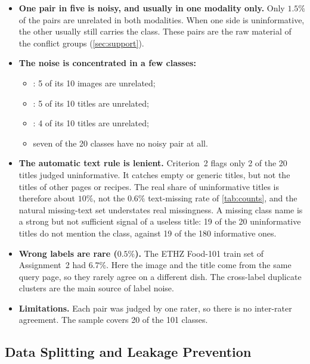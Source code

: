 \begin{itemize}
  \item \textbf{One pair in five is noisy, and usually in one modality only.} Only $1.5\%$ of the pairs are
        unrelated in both modalities. When one side is uninformative, the other usually still carries the class.
        These pairs are the raw material of the conflict groups (\cref{sec:support}).
  \item \textbf{The noise is concentrated in a few classes:}
        \begin{itemize}
          \item {}: 5 of its 10 images are unrelated;
          \item {}: 5 of its 10 titles are unrelated;
          \item {}: 4 of its 10 titles are unrelated;
          \item seven of the 20 classes have no noisy pair at all.
        \end{itemize}
  \item \textbf{The automatic text rule is lenient.} Criterion~2 flags only 2 of the 20 titles judged
        uninformative. It catches empty or generic titles, but not the titles of other pages or recipes.
        The real share of uninformative titles is therefore about $10\%$, not the $0.6\%$ text-missing rate of
        \cref{tab:counts}, and the natural missing-text set understates real missingness. A missing class name is
        a strong but not sufficient signal of a useless title: 19 of the 20 uninformative titles do not mention
        the class, against 19 of the 180 informative ones.
  \item \textbf{Wrong labels are rare ($0.5\%$).} The ETHZ Food-101 train set of Assignment~2 had $6.7\%$. Here the
        image and the title come from the same query page, so they rarely agree on a different dish. The
        cross-label duplicate clusters are the main source of label noise.
  \item \textbf{Limitations.} Each pair was judged by one rater, so there is no inter-rater agreement. The sample
        covers 20 of the 101 classes.
\end{itemize}

\subsection{Data Splitting and Leakage Prevention}
\label{sec:split}

